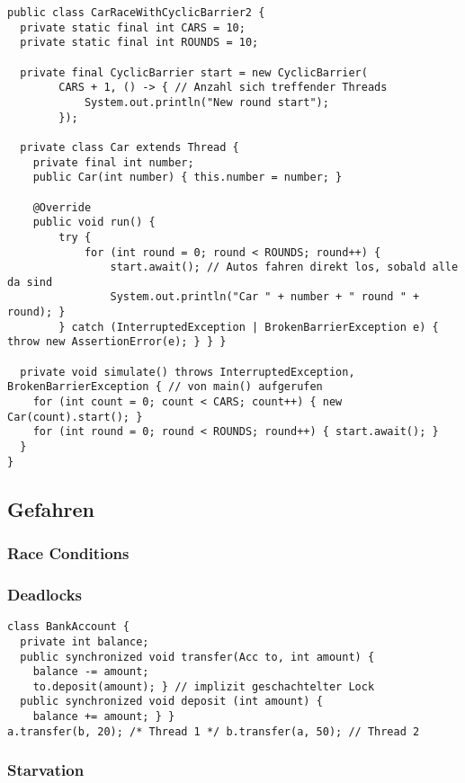 \begin{lstlisting}
public class CarRaceWithCyclicBarrier2 {
  private static final int CARS = 10;
  private static final int ROUNDS = 10;

  private final CyclicBarrier start = new CyclicBarrier(
  		CARS + 1, () -> { // Anzahl sich treffender Threads
  			System.out.println("New round start");
  		});

  private class Car extends Thread {
  	private final int number;
  	public Car(int number) { this.number = number; }

  	@Override
  	public void run() {
  		try {
  			for (int round = 0; round < ROUNDS; round++) {
  				start.await(); // Autos fahren direkt los, sobald alle da sind
  				System.out.println("Car " + number + " round " + round); }
  		} catch (InterruptedException | BrokenBarrierException e) { throw new AssertionError(e); } } }

  private void simulate() throws InterruptedException, BrokenBarrierException { // von main() aufgerufen
  	for (int count = 0; count < CARS; count++) { new Car(count).start(); }
  	for (int round = 0; round < ROUNDS; round++) { start.await(); }
  }
}
\end{lstlisting}

\subsection{Gefahren}

\subsubsection{Race Conditions}

\subsubsection{Deadlocks}

\begin{lstlisting}
class BankAccount {
  private int balance;
  public synchronized void transfer(Acc to, int amount) {
    balance -= amount;
    to.deposit(amount); } // implizit geschachtelter Lock
  public synchronized void deposit (int amount) {
    balance += amount; } }
a.transfer(b, 20); /* Thread 1 */ b.transfer(a, 50); // Thread 2
\end{lstlisting}


\subsubsection{Starvation}
